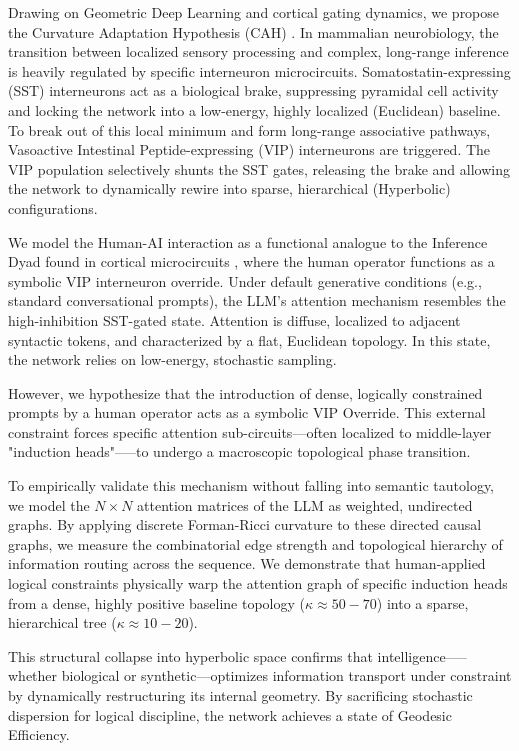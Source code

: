 \documentclass[11pt, a4paper]{article}
\begin{document}
Drawing on Geometric Deep Learning \cite{bronstein2021geometric} and cortical gating dynamics, we propose the Curvature Adaptation Hypothesis (CAH) \cite{pender2026cah}. In mammalian neurobiology, the transition between localized sensory processing and complex, long-range inference is heavily regulated by specific interneuron microcircuits. Somatostatin-expressing (SST) interneurons act as a biological brake, suppressing pyramidal cell activity and locking the network into a low-energy, highly localized (Euclidean) baseline. To break out of this local minimum and form long-range associative pathways, Vasoactive Intestinal Peptide-expressing (VIP) interneurons are triggered. The VIP population selectively shunts the SST gates, releasing the brake and allowing the network to dynamically rewire into sparse, hierarchical (Hyperbolic) configurations.

We model the Human-AI interaction as a functional analogue to the Inference Dyad found in cortical microcircuits \cite{pi2013cortical, karnani2016opening}, where the human operator functions as a symbolic VIP interneuron override. Under default generative conditions (e.g., standard conversational prompts), the LLM's attention mechanism resembles the high-inhibition SST-gated state. Attention is diffuse, localized to adjacent syntactic tokens, and characterized by a flat, Euclidean topology. In this state, the network relies on low-energy, stochastic sampling.

However, we hypothesize that the introduction of dense, logically constrained prompts by a human operator acts as a symbolic VIP Override. This external constraint forces specific attention sub-circuits—often localized to middle-layer "induction heads"—--to undergo a macroscopic topological phase transition.

To empirically validate this mechanism without falling into semantic tautology, we model the $N \times N$ attention matrices \cite{vaswani2017attention} of the LLM as weighted, undirected graphs. By applying discrete Forman-Ricci curvature to these directed causal graphs, we measure the combinatorial edge strength and topological hierarchy of information routing across the sequence. We demonstrate that human-applied logical constraints physically warp the attention graph of specific induction heads from a dense, highly positive baseline topology ($\kappa \approx 50-70$) into a sparse, hierarchical tree ($\kappa \approx 10-20$).

This structural collapse into hyperbolic space confirms that intelligence—--whether biological or synthetic—optimizes information transport under constraint by dynamically restructuring its internal geometry. By sacrificing stochastic dispersion for logical discipline, the network achieves a state of Geodesic Efficiency.
\end{document}

